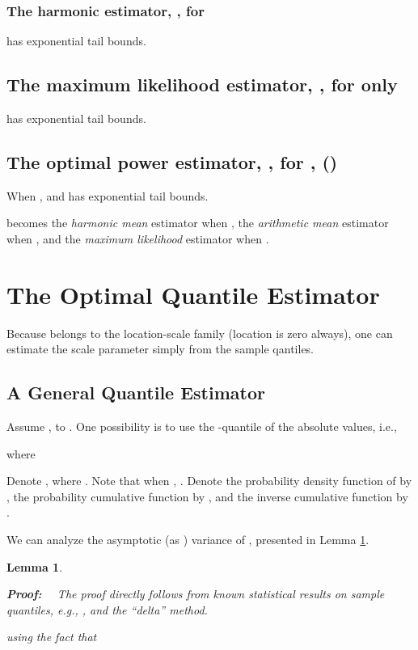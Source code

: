 \documentclass[oneside,10pt]{article}
\newtheorem{lemma}{Lemma}
\begin{document}
\subsubsection{The harmonic estimator, , for }
 has exponential tail bounds.

\subsection{The maximum likelihood estimator, , for  only}
 has exponential tail bounds.

\subsection{The optimal power estimator, , for , ()} 


When ,   and  has exponential tail bounds.

 becomes the {\em harmonic mean} estimator when , the {\em arithmetic mean} estimator when , and the {\em maximum likelihood} estimator when .

\section{The Optimal Quantile Estimator}

Because  belongs to the location-scale family (location is zero always), one can estimate the scale parameter  simply from the sample qantiles.

\subsection{A General Quantile Estimator}
Assume ,  to .  One possibility is to use the -quantile of the absolute values, i.e.,

where


Denote , where . Note that when , . Denote the probability density function of  by , the probability cumulative function by , and the inverse cumulative function by .

We can analyze the asymptotic (as ) variance of , presented in Lemma \ref{lem_q_var}.
\begin{lemma}\label{lem_q_var}

\textbf{Proof:} \ \ The proof directly follows from known statistical results on sample quantiles, e.g., \cite[Theorem
9.2]{Book:David}, and the ``delta'' method.

\noindent using the fact that

\end{lemma}
\end{document}

